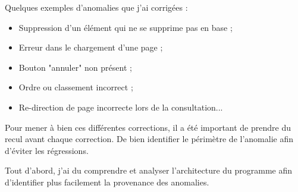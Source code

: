 Quelques exemples d'anomalies que j'ai corrigées : 
\begin{itemize}
    \item Suppression d'un élément qui ne se supprime pas en base ;
    \item Erreur dans le chargement d'une page ;
    \item Bouton "annuler" non présent ;
    \item Ordre ou classement incorrect ;
    \item Re-direction de page incorrecte lors de la consultation...
\end{itemize}

Pour mener à bien ces différentes corrections, il a été important de prendre du recul avant chaque correction. De bien identifier le périmètre de l'anomalie afin d'éviter les régressions.

Tout d'abord, j'ai du comprendre et analyser l'architecture du programme afin d'identifier plus facilement la provenance des anomalies. 

